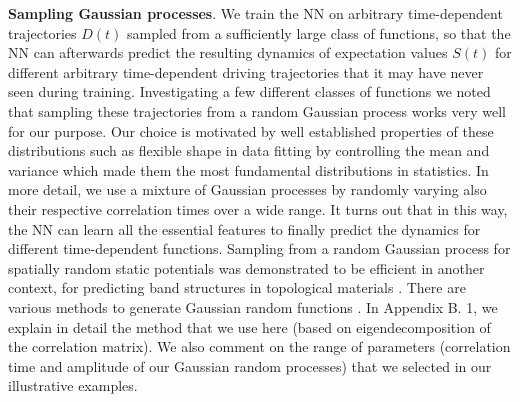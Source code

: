 \documentclass[a4paper,aps,amsmath,amssymb,twocolumn,longbibliography,,accepted=2022-05-17]{quantumarticle}
\begin{document}
\textbf{Sampling Gaussian processes}.
We train the NN on arbitrary time-dependent trajectories $D(t)$ sampled from a sufficiently large class of functions, so that the NN can afterwards predict the resulting dynamics of expectation values $S(t)$ for different arbitrary time-dependent driving trajectories that it may have never seen during training. Investigating a few different classes of functions we noted that sampling these trajectories from a random Gaussian process works very well for our purpose. Our choice is motivated by well established properties of these distributions such as flexible shape in data fitting by controlling the mean and variance which made them the most fundamental distributions in statistics. In more detail, we use a mixture of Gaussian processes by randomly varying also their respective correlation times over a wide range. It turns out that in this way, the NN can learn all the essential features to finally predict the dynamics for different time-dependent functions. Sampling from a random Gaussian process for spatially random static potentials was demonstrated to be efficient in another context, for predicting band structures in topological materials \cite{peano2019rapid}.  There are various methods to generate Gaussian random functions \cite{liu2019advances}. In Appendix B. 1, we explain in detail the method that we use here (based on eigendecomposition of the correlation matrix). We also comment on the range of parameters (correlation time and amplitude of our Gaussian random processes) that we selected in our illustrative examples.
\end{document}
